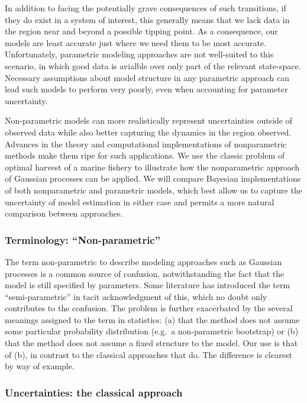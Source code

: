 \documentclass[author-year, review]{elsarticle} %
\begin{document}
In addition to facing the potentially grave consequences of such
transitions, if they do exist in a system of interest, this generally
means that we lack data in the region near and beyond a possible tipping
point. As a consequence, our models are least accurate just where we
need them to be most accurate.\\Unfortunately, parametric modeling
approaches are not well-suited to this scenario, in which good data is
avialble over only part of the relevant state-space. Necessary
assumptions about model structure in any parametric approach can lead
such models to perform very poorly, even when accounting for parameter
uncertainty.

Non-parametric models can more realistically represent uncertainties
outside of observed data while also better capturing the dynamics in the
region observed. Advances in the theory and computational
implementations of nonparametric methods make them ripe for such
applications. We use the classic problem of optimal harvest of a marine
fishery to illustrate how the nonparametric approach of Gaussian
processes can be applied. We will compare Bayesian implementations of
both nonparametric and parametric models, which best allow us to capture
the uncertainty of model estimation in either case and permits a more
natural comparison between approaches.

\subsubsection{Terminology: ``Non-parametric''}

The term non-parametric to describe modeling approaches such as Gaussian
processes is a common source of confusion, notwithstanding the fact that
the model is still specified by parameters. Some literature has
introduced the term ``semi-parametric'' in tacit acknowledgment of this,
which no doubt only contributes to the confusion. The problem is further
exacerbated by the several meanings assigned to the term in statistics:
(a) that the method does not assume some particular probability
distribution (e.g.~a non-parametric bootstrap) or (b) that the method
does not assume a fixed structure to the model. Our use is that of (b),
in contrast to the classical approaches that do. The difference is
clearest by way of example.

\subsubsection{Uncertainties: the classical approach}
\end{document}
